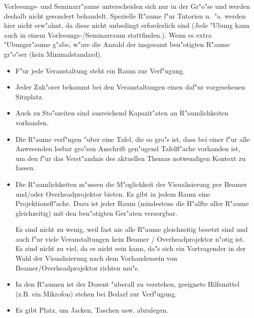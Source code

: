 \begin{kcmt}\begin{komacmt}
Vorlesungs- und Seminarr"aume unterscheiden sich nur in der Gr"o"se und 
werden deshalb nicht gesondert behandelt. Spezielle R"aume f"ur Tutorien u.~"a. 
werden hier nicht erw"ahnt, da diese nicht unbedingt erforderlich sind 
(Jede "Ubung kann auch in einem Vorlesungs-/Seminarraum stattfinden.). 
Wenn es extra "Ubungsr"aume g"abe, w"are die Anzahl der insgesamt 
ben"otigten R"aume gr"o"ser (kein Minimalstandard).
\end{komacmt}\end{kcmt}
\begin{itemize}
	\item F"ur jede Veranstaltung steht ein Raum zur Verf"ugung.
	\item Jeder Zuh"orer bekommt bei den Veranstaltungen einen daf"ur vorgesehenen Sitzplatz.
	\item Auch zu Sto"szeiten sind ausreichend Kapazit"aten an R"aumlichkeiten vorhanden.
	\item Die R"aume verf"ugen "uber eine Tafel, die so gro"s ist,
		dass bei einer f"ur alle Anwesenden lesbar gro"sen Anschrift gen"ugend Tafelfl"ache vorhanden ist, um den f"ur das Verst"andnis des aktuellen Themas notwendigen Kontext zu fassen.
	\item Die R"aumlichkeiten m"ussen die M"oglichkeit der Visualisierung per Beamer 
		und/oder Overheadprojektor bieten. Es gibt in jedem Raum eine Projektionsfl"ache. 
		Dazu ist jeder Raum (mindestens die H"alfte aller R"aume gleichzeitig) mit den ben"otigten Ger"aten versorgbar.
\begin{kcmt}\begin{komacmt}
	Es sind nicht zu wenig, weil fast nie alle R"aume gleichzeitig besetzt sind und auch
	f"ur viele Veranstaltungen kein Beamer / Overheadprojektor n"otig ist. Es sind nicht
	zu viel, da es nicht sein kann, da"s sich ein Vortragender in der Wahl der Visualisierung
	nach dem Vorhandensein von Beamer/Overheadprojektor richten mu"s.
\end{komacmt}\end{kcmt}
	\item In den R"aumen ist der Dozent "uberall zu verstehen,
		geeignete Hilfsmittel (z.B. ein Mikrofon) stehen bei Bedarf zur Verf"ugung.
	\item Es gibt Platz, um Jacken, Taschen usw. abzulegen.
\end{itemize}

